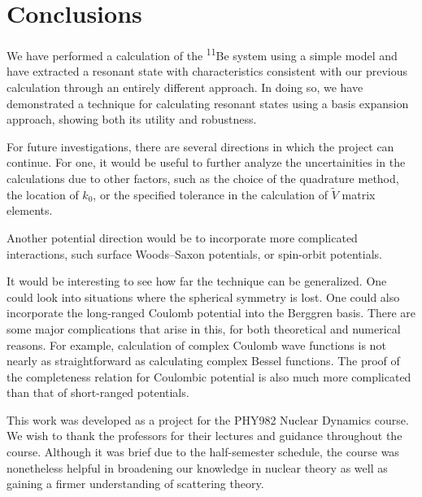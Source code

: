 \documentclass[amsmath, amssymb, aps, floatfix, nofootinbib, preprintnumbers,
  showpacs, superscriptaddress, twocolumn]{revtex4-1}
\begin{document}
\section{Conclusions}

We have performed a calculation of the \textsuperscript{11}Be system using a
simple model and have extracted a resonant state with characteristics
consistent with our previous calculation through an entirely different
approach.  In doing so, we have demonstrated a technique for calculating
resonant states using a basis expansion approach, showing both its utility and
robustness.

For future investigations, there are several directions in which the project
can continue.  For one, it would be useful to further analyze the
uncertainities in the calculations due to other factors, such as the choice of
the quadrature method, the location of $k_0$, or the specified tolerance in
the calculation of $\tilde V$ matrix elements.

Another potential direction would be to incorporate more complicated
interactions, such surface Woods--Saxon potentials, or spin-orbit potentials.

It would be interesting to see how far the technique can be generalized.  One
could look into situations where the spherical symmetry is lost.  One could
also incorporate the long-ranged Coulomb potential into the Berggren basis.
There are some major complications that arise in this, for both theoretical
and numerical reasons.  For example, calculation of complex Coulomb wave
functions is not nearly as straightforward as calculating complex Bessel
functions.  The proof of the completeness relation for Coulombic potential is
also much more complicated than that of short-ranged
potentials.\cite{Michel2011}

\begin{acknowledgments}
  This work was developed as a project for the PHY982 Nuclear Dynamics course.
  We wish to thank the professors for their lectures and guidance throughout
  the course.  Although it was brief due to the half-semester schedule, the
  course was nonetheless helpful in broadening our knowledge in nuclear theory
  as well as gaining a firmer understanding of scattering theory.
\end{acknowledgments}

\end{document}
